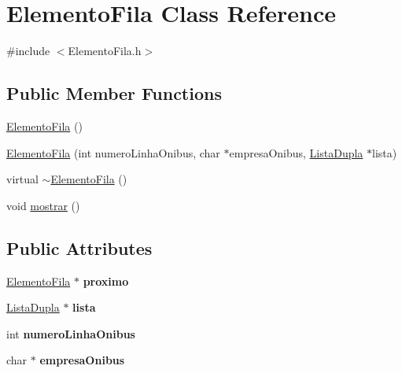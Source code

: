 \hypertarget{classElementoFila}{\section{\-Elemento\-Fila \-Class \-Reference}
\label{classElementoFila}
}


{\ttfamily \#include $<$\-Elemento\-Fila.\-h$>$}

\subsection*{\-Public \-Member \-Functions}
\begin{DoxyCompactItemize}
\item 
\hyperlink{classElementoFila_a512a2203427402b10e91f820fea41803}{\-Elemento\-Fila} ()
\item 
\hyperlink{classElementoFila_a3fa1d253c6d4b61eb8f3e246dbd7ad3c}{\-Elemento\-Fila} (int numero\-Linha\-Onibus, char $\ast$empresa\-Onibus, \hyperlink{classListaDupla}{\-Lista\-Dupla} $\ast$lista)
\item 
virtual \hyperlink{classElementoFila_ac39f5ff146226ff5429e129226a98180}{$\sim$\-Elemento\-Fila} ()
\item 
void \hyperlink{classElementoFila_a8e34449520218e3a7f64fbb1efa5f4ab}{mostrar} ()
\end{DoxyCompactItemize}
\subsection*{\-Public \-Attributes}
\begin{DoxyCompactItemize}
\item 
\hypertarget{classElementoFila_a3ea4e7e3896383ff3964afc7cd3970e9}{\hyperlink{classElementoFila}{\-Elemento\-Fila} $\ast$ {\bfseries proximo}}\label{classElementoFila_a3ea4e7e3896383ff3964afc7cd3970e9}

\item 
\hypertarget{classElementoFila_ac1a5b37565e5a168147c647d827c53b3}{\hyperlink{classListaDupla}{\-Lista\-Dupla} $\ast$ {\bfseries lista}}\label{classElementoFila_ac1a5b37565e5a168147c647d827c53b3}

\item 
\hypertarget{classElementoFila_a2b9bf9891345536fe0af087da3b51fc4}{int {\bfseries numero\-Linha\-Onibus}}\label{classElementoFila_a2b9bf9891345536fe0af087da3b51fc4}

\item 
\hypertarget{classElementoFila_a2fe889a9f320220bdcf087a24f11676f}{char $\ast$ {\bfseries empresa\-Onibus}}\label{classElementoFila_a2fe889a9f320220bdcf087a24f11676f}

\end{DoxyCompactItemize}


